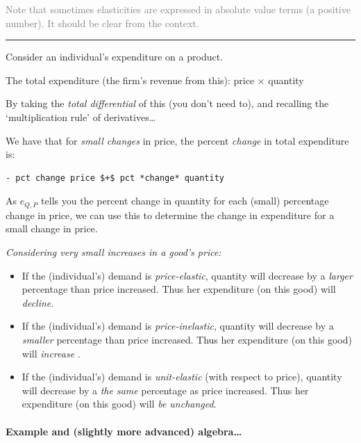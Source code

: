 \documentclass[]{article}
\let\oldparagraph\paragraph
\renewcommand{\paragraph}[1]{\oldparagraph{#1}\mbox{}}
\begin{document}
\textcolor{gray}{Note that sometimes elasticities are expressed in absolute value terms (a positive number). It should be clear from the context.}

\begin{center}\rule{0.5\linewidth}{\linethickness}\end{center}

Consider an individual's expenditure on a product.

The total expenditure (the firm's revenue from this): price \(\times\)
quantity

By taking the \emph{total differential} of this (you don't need to), and
recalling the `multiplication rule' of derivatives\ldots{}

We have that for \emph{small changes} in price, the percent
\emph{change} in total expenditure is:

\begin{verbatim}
- pct change price $+$ pct *change* quantity
\end{verbatim}

As \(e_{Q,P}\) tells you the percent change in quantity for each (small)
percentage change in price, we can use this to determine the change in
expenditure for a small change in price.

\emph{Considering very small increases in a good's price:}

\begin{itemize}
\item
  If the (individual's) demand is \emph{price-elastic}, quantity will
  decrease by a \emph{larger} percentage than price increased. Thus her
  expenditure (on this good) will \emph{decline}.
\item
  If the (individual's) demand is \emph{price-inelastic}, quantity will
  decrease by a \emph{smaller} percentage than price increased. Thus her
  expenditure (on this good) will \emph{increase }.
\item
  If the (individual's) demand is \emph{unit-elastic} (with respect to
  price), quantity will decrease by a \emph{the same} percentage as
  price increased. Thus her expenditure (on this good) will \emph{be
  unchanged}.
\end{itemize}

\bigskip

\hypertarget{example-and-slightly-more-advanced-algebra}{%
\paragraph{Example and (slightly more advanced)
algebra\ldots{}}\label{example-and-slightly-more-advanced-algebra}}
\end{document}

